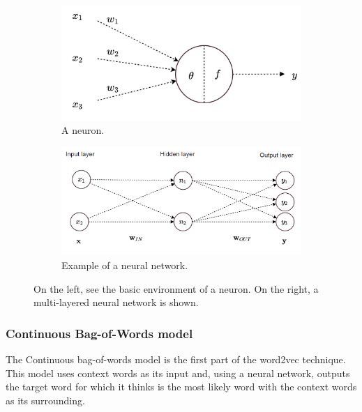 \documentclass[a4paper,11pt]{article}
\begin{document}
\begin{figure}[h]
\begin{subfigure}{.5\textwidth}
  \centering
  \includegraphics[width=.8\linewidth]{Neuron.png}
  \caption{A neuron.}
  \label{figure:neuron}
\end{subfigure}%
\begin{subfigure}{.6\textwidth}
  \centering
  \includegraphics[width=.9\linewidth]{NeuralNetworkExample.png}
  \caption{Example of a neural network.}
  \label{figure:neuralnetwork}
\end{subfigure}
\caption{On the left, see the basic environment of a neuron. On the right, a multi-layered neural network is shown.}
\label{figure:NeuralNetworks}
\end{figure}

\subsubsection{Continuous Bag-of-Words model}
The Continuous bag-of-words model is the first part of the word2vec technique. This model uses context words as its input and, using a neural network, outputs the target word for which it thinks is the most likely word with the context words as its surrounding.
\end{document}
